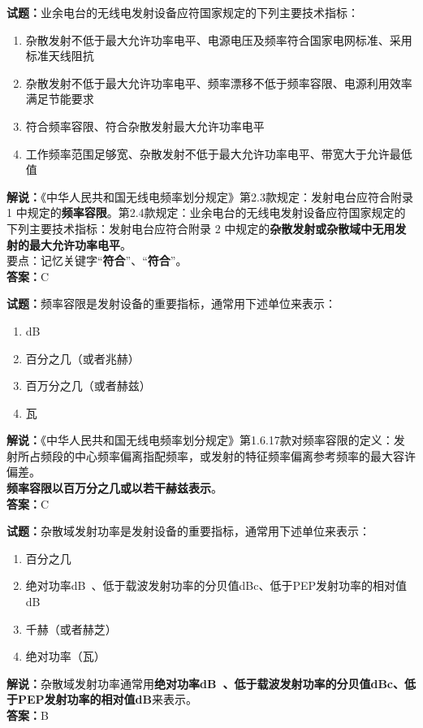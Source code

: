 \documentclass{ctexbook}
\begin{document}
\bigskip

\noindent\textbf{试题：}业余电台的无线电发射设备应符国家规定的下列主要技术指标：
\begin{enumerate}[leftmargin=3em]
  \item 杂散发射不低于最大允许功率电平、电源电压及频率符合国家电网标准、采用标准天线阻抗
  \item 杂散发射不低于最大允许功率电平、频率漂移不低于频率容限、电源利用效率满足节能要求
  \item 符合频率容限、符合杂散发射最大允许功率电平
  \item 工作频率范围足够宽、杂散发射不低于最大允许功率电平、带宽大于允许最低值
\end{enumerate}
\noindent\textbf{解说：}《中华人民共和国无线电频率划分规定》第2.3款规定：发射电台应符合附录 1 中规定的\textbf{频率容限}。第2.4款规定：业余电台的无线电发射设备应符国家规定的下列主要技术指标：发射电台应符合附录 2 中规定的\textbf{杂散发射或杂散域中无用发射的最大允许功率电平}。\\要点：记忆关键字“\textbf{符合}”、“\textbf{符合}”。\\\noindent\textbf{答案：}C

\bigskip

\noindent\textbf{试题：}频率容限是发射设备的重要指标，通常用下述单位来表示：
\begin{enumerate}[leftmargin=3em]
  \item dB
  \item 百分之几（或者兆赫）
  \item 百万分之几（或者赫兹）
  \item 瓦
\end{enumerate}
\noindent\textbf{解说：}《中华人民共和国无线电频率划分规定》第1.6.17款对频率容限的定义：发射所占频段的中心频率偏离指配频率，或发射的特征频率偏离参考频率的最大容许偏差。\\\textbf{频率容限以百万分之几或以若干赫兹表示}。\\\noindent\textbf{答案：}C

\bigskip

\noindent\textbf{试题：}杂散域发射功率是发射设备的重要指标，通常用下述单位来表示：
\begin{enumerate}[leftmargin=3em]
  \item 百分之几
  \item 绝对功率\unit[qualifier-mode=combine]{\deci\bel{}}、低于载波发射功率的分贝值dBc、低于PEP发射功率的相对值dB
  \item 千赫（或者赫芝）
  \item 绝对功率（瓦）
\end{enumerate}
\noindent\textbf{解说：}杂散域发射功率通常用\textbf{绝对功率\unit[qualifier-mode=combine]{\deci\bel{}}、低于载波发射功率的分贝值dBc、低于PEP发射功率的相对值dB}来表示。\\\noindent\textbf{答案：}B
\end{document}
